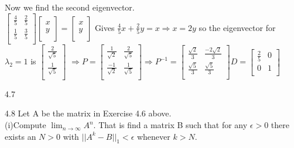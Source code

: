 \documentclass[12pt]{article}
\newenvironment{problems}{\begin{list}{}{\setlength{\labelwidth}{.7in}}}{\end{list}}
\begin{document}
\begin{problems}
Now we find the second eigenvector.\\
$\begin{bmatrix}
   \frac{4}{5} & \frac{2}{5} \\
   \frac{1}{5} & \frac{3}{5} \\
  \end{bmatrix} 
  \begin{bmatrix}
   x\\
   y\\
  \end{bmatrix} =
  \begin{bmatrix}
   x\\
   y\\
  \end{bmatrix} $
Gives $\frac{4}{5}x + \frac{2}{5}y = x \Rightarrow x=2y$ so the eigenvector for $\lambda_2 = 1$ is  $\begin{bmatrix}
   \frac{2}{\sqrt{5}}\\
   \frac{1}{\sqrt{5}}\\
  \end{bmatrix} $
$ \Rightarrow P = \begin{bmatrix}
   \frac{1}{\sqrt{2}}  &  \frac{2}{\sqrt{5}} \\
   \frac{-1}{\sqrt{2}}  &  \frac{1}{\sqrt{5}} \\
  \end{bmatrix} 
  \Rightarrow P^{-1} = \begin{bmatrix}
   \frac{\sqrt{2}}{3}  &  \frac{-2\sqrt{2}}{3} \\
   \frac{\sqrt{5}}{3}  &  \frac{\sqrt{5}}{3} \\
  \end{bmatrix} 
  D = \begin{bmatrix}
   \frac{2}{5}  & 0\\
   0  &  1 \\
  \end{bmatrix} 
  $
  
\item[4.7]

\item[4.8]
Let A be the matrix in Exercise 4.6 above.\\
(i)Compute $\displaystyle\lim_{n \to \infty} A^n$. That is find a matrix B such that for any $\epsilon > 0$ there exists an $N>0$ with $||A^k - B||_{1}< \epsilon$ whenever $k>N$. \\


\end{problems}
\end{document}
